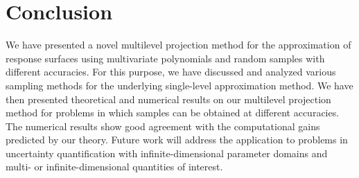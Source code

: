 {\section{Conclusion}

We have presented a novel multilevel projection method for the approximation of response surfaces using multivariate polynomials and random samples with different accuracies. For this purpose, we have discussed and analyzed various sampling methods for the underlying single-level approximation method. We have then presented theoretical and numerical results on our multilevel projection method for problems in which samples can be obtained at different accuracies. The numerical results show good agreement with the computational gains predicted by our theory. Future work will address the application to problems in uncertainty quantification with infinite-dimensional parameter domains and multi- or infinite-dimensional quantities of interest.}
